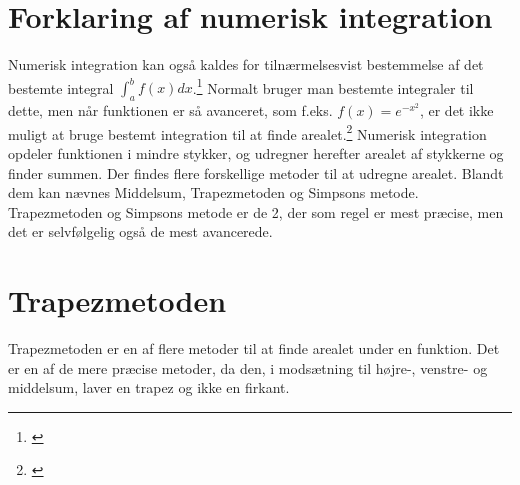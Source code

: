 \documentclass[12pt]{article}
\numberwithin{equation}{section}
\begin{document}
\section{Forklaring af numerisk integration}
Numerisk integration kan også kaldes for tilnærmelsesvist bestemmelse af det bestemte integral $\int_{a}^{b}f(x)dx$.\footnote{\cite{numeriskintegration}} Normalt bruger man bestemte integraler til dette, men når funktionen er så avanceret, som f.eks. $f(x)=e^{-x^2}$, er det ikke muligt at bruge bestemt integration til at finde arealet.\footnote{\cite{2012matA}} Numerisk integration opdeler funktionen i mindre stykker, og udregner herefter arealet af stykkerne og finder summen. Der findes flere forskellige metoder til at udregne arealet. Blandt dem kan nævnes Middelsum, Trapezmetoden og Simpsons metode. Trapezmetoden og Simpsons metode er de 2, der som regel er mest præcise, men det er selvfølgelig også de mest avancerede.

\section{Trapezmetoden}
\label{sec:trapezmetoden}
Trapezmetoden er en af flere metoder til at finde arealet under en funktion. Det er en af de mere præcise metoder, da den, i modsætning til højre-, venstre- og middelsum, laver en trapez og ikke en firkant.
\end{document}
